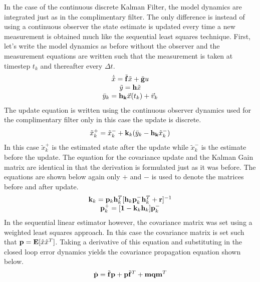 In the case of the continuous discrete Kalman Filter, the model
dynamics are integrated just as in the complimentary filter. The only
difference is instead of using a continuous observer the state
estimate is updated every time a new measurement is obtained much like
the sequential least squares technique. First, let's write the model
dynamics as before without the observer and the measurement equations
are written such that the measurement is taken at timestep $t_k$ and
thereafter every $\Delta t$. 
\begin{equation}\label{e:model_dynamics}
  \begin{matrix}
    \dot{\tilde{x}} = \tilde{{\bf f}}\tilde{x} + \tilde{{\bf g}}u \\
    \tilde{y} = {\bf h}\tilde{x} \\
    \bar{y}_k = {\bf h_k}\vec{x}(t_k) + \vec{v}_k
  \end{matrix}
\end{equation}
The update equation is written using the continuous observer dynamics
used for the complimentary filter only in this case the update is
discrete.
\begin{equation}\label{e:state_update}
  \tilde{x}_k^+ = \tilde{x}_k^- + {\bf k}_k(\bar{y}_k-{\bf
    h_k}\tilde{x}_k^-)
\end{equation}
In this case $\tilde{x}_k^+$ is the estimated state after the update
while $\tilde{x}_k^-$ is the estimate before the update. The equation
for the covariance update and the Kalman Gain matrix are identical in
that the derivation is formulated just as it was before. The equations
are shown below again only $+$ and $-$ is used to denote the matrices
before and after update.
\begin{equation}\label{e:kalman_gain}
  \begin{matrix}
  {\bf k}_{k} = {\bf p}_{k}{\bf h}_{k}^T[{\bf h}_{k}{\bf p}_k^-{\bf h}_{k}^T+{\bf r}]^{-1}\\
  {\bf p}_{k}^+ = [{\bf 1} - {\bf k}_{k}{\bf h}_{k}]{\bf p}_k^-
  \end{matrix}
\end{equation}
In the sequential linear estimator however, the covariance matrix was
set using a weighted least squares approach. In this case the
covariance matrix is set such that ${\bf p} = {\bf
  E}[\hat{x}\hat{x}^T]$. Taking a derivative of this equation and
substituting in the closed loop error dynamics yields the covariance
propagation equation shown below.
\begin{equation}\label{e:covariance_dynamics}
  \dot{{\bf p}} = \tilde{{\bf f}}{\bf p} + {\bf p}\tilde{{\bf f}}^T +
      {\bf m}{\bf q}{\bf m}^T
\end{equation}
